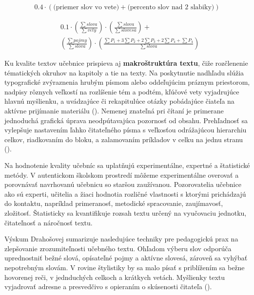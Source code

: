 \begin{ceqn}\begin{align}
0.4 \cdot (\text{(priemer slov vo vete)} + \text{(percento slov nad 2 slabiky)})
\label{equ:fog-index}
\end{align}\end{ceqn}

\begin{equation}\begin{split}
& 0.1 \cdot \left(\frac{\sum slova}{\sum vety}\right) \cdot  \left(\frac{\sum slova}{\sum slovesa}\right) + \\
& \left(\frac{\sum pojmy}{\sum slova}\right) \cdot \left(\frac{\sum P_1 + 3\sum P_2 + 2\sum P_3 + 2\sum P_4 + \sum P_4}{\sum slova}\right)
\label{equ:nestler-method}
\end{split}\end{equation}

Ku kvalite textov učebnice prispieva aj \textbf{makroštruktúra textu}, čiže rozčlenenie tématických okruhov na kapitoly a tie na texty. Na poskytnutie nadhľadu slúžia typografické zvýraznenia hrubým písmom alebo oddeľujúcim práznym priestorom, nadpisy rôznych veľkostí na rozlíšenie tém a podtém, kľúčové vety vyjadrujúce hlavnú myšlienku, a uvádzajúce či rekapitulúce otázky pobádajúce čiateľa na aktívne prijímanie materiálu (\cite{pavlovkin_ziak_1989}). Nemenej znateľná pri čítaní je primerane jednoduchá grafická úprava neodpútavajúca pozornosť od obsahu. Prehľadnosť sa vylepšuje nastavením ľahko čitateľného písma s veľkosťou odrážajúcou hierarchiu celkov, riadkovaním do bloku, a zalamovaním príkladov v celku na jednu stranu (\cite{mlady_tvorba_1988}).

Na hodnotenie kvality učebníc sa uplatňujú experimentálne, expertné a štatistické metódy. V autentickom školskom prostredí môžeme experimentálne overovať a porovnávať navrhovanú učebnicu so staršou zaužívanou. Pozorovatelia učebnice ako sú experti, učitelia a žiaci hodnotia rozličné vlastnosti s ktorými prichádzajú do kontaktu, napríklad primeranosť, metodické spracovanie, zaujímavosť, zložitosť. Štatisticky sa kvantifikuje rozsah textu určený na vyučovaciu jednotku, čitateľnosť a náročnosť textu.

Výskum Drahošovej sumarizuje nasledujúce techniky pre pedagogickú prax na zlepšovanie zrozumiteľnosti učebného textu. Ohľadom výberu slov odporúča uprednostniť bežné slová, opísateľné pojmy a aktívne slovesá, zároveň sa vyhýbať nepotrebným slovám. V rovine štylistiky by sa malo písať s priblížením sa bežne hovorenej reči, v jednduchých celkoch a krátkych vetách. Myšlienky textu vyjadrovať adresne a presvedčivo s opieraním o skúsenosti čitateľa (\cite{drahosova_hodnotenie_2014}).

